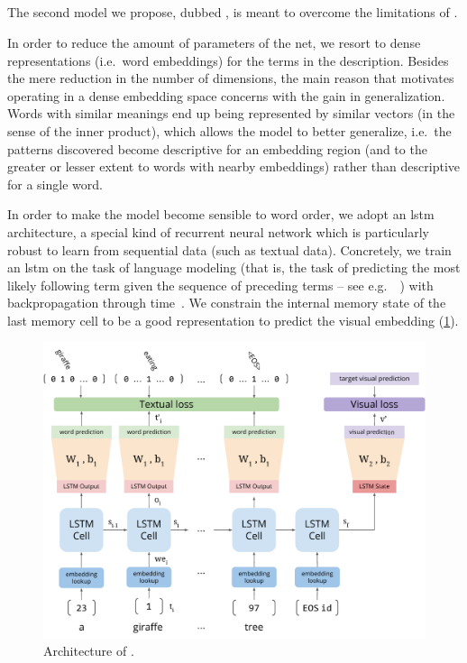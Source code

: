 \subsection{\densettv{}}
\label{subsec:t2v:dense-t2v}

The second model we propose, dubbed \densettv{}, is meant to overcome the limitations of \sparsettv{}.

In order to reduce the amount of parameters of the net, we resort to dense representations (i.e.\ word embeddings) for the terms in the description.
Besides the mere reduction in the number of dimensions, the main reason that motivates operating in a dense embedding space concerns with the gain in generalization.
Words with similar meanings end up being represented by similar vectors (in the sense of the inner product), which allows the model to better generalize, i.e.\ the patterns discovered become descriptive for an embedding region (and to the greater or lesser extent to words with nearby embeddings) rather than descriptive for a single word.

In order to make the model become sensible to word order, we adopt an \acrfull{lstm}~\cite{hochreiter1997long} architecture, a special kind of recurrent neural network which is particularly robust to learn from sequential data (such as textual data).
Concretely, we train an \gls{lstm} on the task of language modeling (that is, the task of predicting the most likely following term given the sequence of preceding terms -- see e.g.\ ~\cite{sundermeyer2012lstm}) with backpropagation through time~\cite{werbos1990backpropagation}.
We constrain the internal memory state of the last memory cell to be a good representation to predict the visual embedding (\ref{fig:t2v:d-t2v-arch}).

\begin{figure}
\includegraphics[width=\linewidth]{d-t2v-arch}
\caption{Architecture of \densettv{}.} \label{fig:t2v:d-t2v-arch}
\end{figure}

